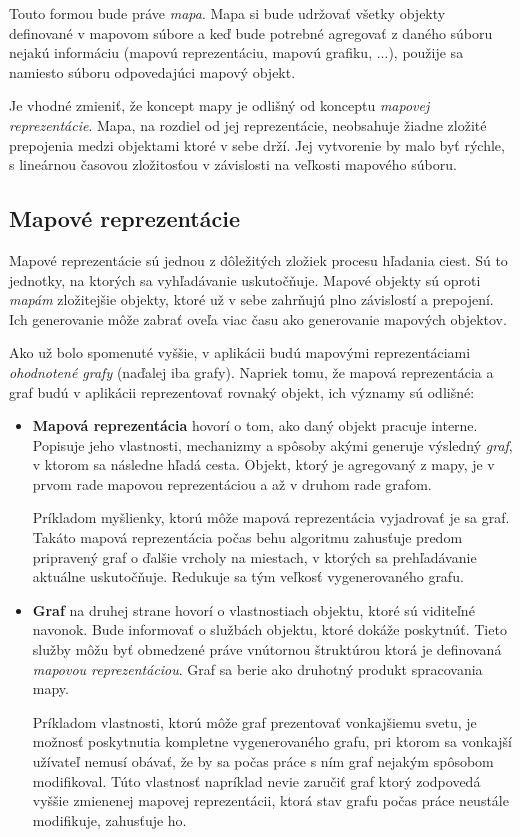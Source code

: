 Touto formou bude práve \textit{mapa}. Mapa si bude udržovať všetky objekty definované v mapovom súbore a keď bude potrebné agregovať z daného súboru nejakú informáciu (mapovú reprezentáciu, mapovú grafiku, ...), použije sa namiesto súboru odpovedajúci mapový objekt.

Je vhodné zmieniť, že koncept mapy je odlišný od konceptu \textit{mapovej reprezentácie}. Mapa, na rozdiel od jej reprezentácie, neobsahuje žiadne zložité prepojenia medzi objektami ktoré v sebe drží. Jej vytvorenie by malo byť rýchle, s lineárnou časovou zložitosťou v závislosti na veľkosti mapového súboru.

\subsection{Mapové reprezentácie}\label{mapove_reprezentacie}

Mapové reprezentácie sú jednou z dôležitých zložiek procesu hľadania ciest. Sú to jednotky, na ktorých sa vyhľadávanie uskutočňuje. Mapové objekty sú oproti \textit{mapám} zložitejšie objekty, ktoré už v sebe zahrňujú plno závislostí a prepojení. Ich generovanie môže zabrať oveľa viac času ako generovanie mapových objektov. 

Ako už bolo spomenuté vyššie, v aplikácii budú mapovými reprezentáciami \textit{ohodnotené grafy} (naďalej iba grafy). Napriek tomu, že mapová reprezentácia a graf budú v aplikácii reprezentovať rovnaký objekt, ich významy sú odlišné:

\begin{itemize}
    \item \textbf{Mapová reprezentácia} hovorí o tom, ako daný objekt pracuje interne. Popisuje jeho vlastnosti, mechanizmy a spôsoby akými generuje výsledný \textit{graf}, v ktorom sa následne hľadá cesta. Objekt, ktorý je agregovaný z mapy, je v prvom rade mapovou reprezentáciou a až v druhom rade grafom.
    
    Príkladom myšlienky, ktorú môže mapová reprezentácia vyjadrovať je  sa graf. Takáto mapová reprezentácia počas behu algoritmu zahusťuje predom pripravený graf o ďalšie vrcholy na miestach, v ktorých sa prehľadávanie aktuálne uskutočňuje. Redukuje sa tým veľkosť vygenerovaného grafu.   
    \item\textbf{Graf} na druhej strane hovorí o vlastnostiach objektu, ktoré sú viditeľné navonok. Bude informovať o  službách objektu, ktoré dokáže poskytnúť. Tieto služby môžu byť obmedzené práve vnútornou štruktúrou ktorá je definovaná \textit{mapovou reprezentáciou}. Graf sa berie ako druhotný produkt spracovania mapy.   

    Príkladom vlastnosti, ktorú môže graf prezentovať vonkajšiemu svetu, je možnosť poskytnutia kompletne vygenerovaného grafu, pri ktorom sa vonkajší užívateľ nemusí obávať, že by sa počas práce s ním graf nejakým spôsobom modifikoval. Túto vlastnosť napríklad nevie zaručiť graf ktorý zodpovedá vyššie zmienenej mapovej reprezentácii, ktorá stav grafu počas práce neustále modifikuje, zahusťuje ho.
\end{itemize}

